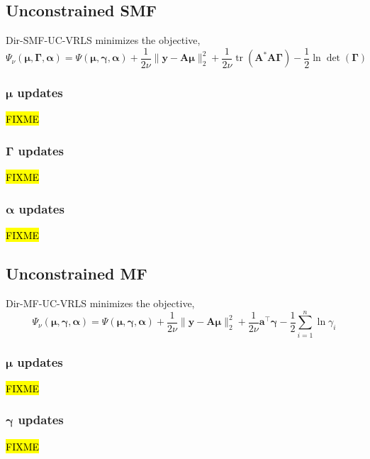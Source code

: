 \documentclass{article}
\newcommand{\m}[1]{\boldsymbol{#1}}
\DeclareMathOperator{\trace}{tr}
\begin{document}
\subsection{Unconstrained SMF}
Dir-SMF-UC-VRLS minimizes the objective,
\begin{equation}
\Psi_\nu(\m{\mu}, \m{\Gamma}, \m{\alpha}) =
 \Psi(\m{\mu}, \m{\gamma}, \m{\alpha})
 +\frac{1}{2 \nu} \| \m{y} - \m{A} \m{\mu} \|_2^2
 +\frac{1}{2 \nu} \trace(\m{A}^* \m{A} \m{\Gamma})
 -\frac{1}{2} \ln \det(\m{\Gamma})
\label{eq:uc_vrls_smf_obj}
\end{equation}

\subsubsection{$\m{\mu}$ updates}
\hl{FIXME}

\subsubsection{$\m{\Gamma}$ updates}
\hl{FIXME}

\subsubsection{$\m{\alpha}$ updates}
\hl{FIXME}

\subsection{Unconstrained MF}
Dir-MF-UC-VRLS minimizes the objective,
\begin{equation}
\Psi_\nu(\m{\mu}, \m{\gamma}, \m{\alpha}) =
 \Psi(\m{\mu}, \m{\gamma}, \m{\alpha})
 +\frac{1}{2 \nu} \| \m{y} - \m{A} \m{\mu} \|_2^2
 +\frac{1}{2 \nu} \m{a}^\top \m{\gamma}
 -\frac{1}{2} \sum_{i=1}^n \ln \gamma_i
\label{eq:uc_vrls_mf_obj}
\end{equation}

\subsubsection{$\m{\mu}$ updates}
\hl{FIXME}

\subsubsection{$\m{\gamma}$ updates}
\hl{FIXME}
\end{document}
